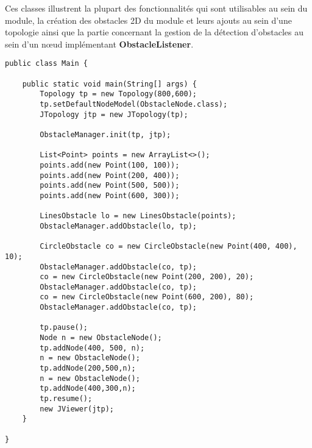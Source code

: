 \documentclass{article}
\begin{document}
Ces classes illustrent la plupart des fonctionnalités qui sont utilisables au sein du module, la création des obstacles 2D du module et leurs ajouts au sein d'une topologie ainsi que la partie concernant la gestion de la détection d'obstacles au sein d'un nœud implémentant \textbf{ObstacleListener}.\medskip

\begin{lstlisting}[frame=shadowbox,captionpos=b,caption={Classe Main},abovecaptionskip=2ex,label={main}]
public class Main {

    public static void main(String[] args) {
        Topology tp = new Topology(800,600);
        tp.setDefaultNodeModel(ObstacleNode.class);
        JTopology jtp = new JTopology(tp);

        ObstacleManager.init(tp, jtp);

        List<Point> points = new ArrayList<>();
        points.add(new Point(100, 100));
        points.add(new Point(200, 400));
        points.add(new Point(500, 500));
        points.add(new Point(600, 300));

        LinesObstacle lo = new LinesObstacle(points);
        ObstacleManager.addObstacle(lo, tp);

        CircleObstacle co = new CircleObstacle(new Point(400, 400), 10);
        ObstacleManager.addObstacle(co, tp);
        co = new CircleObstacle(new Point(200, 200), 20);
        ObstacleManager.addObstacle(co, tp);
        co = new CircleObstacle(new Point(600, 200), 80);
        ObstacleManager.addObstacle(co, tp);

        tp.pause();
        Node n = new ObstacleNode();
        tp.addNode(400, 500, n);
        n = new ObstacleNode();
        tp.addNode(200,500,n);
        n = new ObstacleNode();
        tp.addNode(400,300,n);
        tp.resume();
        new JViewer(jtp);
    }

}
\end{lstlisting}
\end{document}
